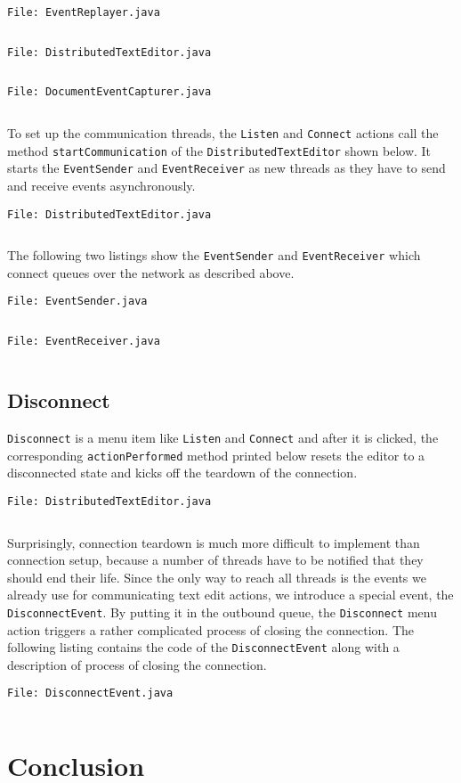 \documentclass[a4paper,draft,12pt,oneside,article,table]{memoir}
\newcommand{\srcpath}{../ex09/src/main/java/ddist}
\newcommand{\inmnt}[3]{\vspace{1em}\noindent\texttt{\color{gray}File: #3}\vspace{-1em}\inputminted[tabsize=4,firstline=#1,firstnumber=#1,lastline=#2,linenos]{java}{\srcpath/#3}}
\newcommand{\mil}[1]{\texttt{#1}}
\begin{document}
\inmnt{1}{1000}{EventReplayer.java}

\inmnt{43}{67}{DistributedTextEditor.java}

\inmnt{30}{39}{DocumentEventCapturer.java}

To set up the communication threads, the \mil{Listen} and \mil{Connect} actions
call the method \mil{startCommunication} of the
\mil{DistributedTextEditor} shown below. It starts the \mil{EventSender}
and \mil{EventReceiver} as new threads as they have to send and receive
events asynchronously.

\inmnt{300}{318}{DistributedTextEditor.java}

The following two listings show the \mil{EventSender} and
\mil{EventReceiver} which connect queues over the network as described
above.

\inmnt{1}{1000}{EventSender.java}

\inmnt{1}{1000}{EventReceiver.java}

\section{Disconnect}

\mil{Disconnect} is a menu item like \mil{Listen} and \mil{Connect} and
after it is clicked, the corresponding \mil{actionPerformed} method
printed below resets the editor to a disconnected state and kicks off
the teardown of the connection.

\inmnt{230}{240}{DistributedTextEditor.java}

Surprisingly, connection teardown is much more difficult to implement
than connection setup, because a number of threads have to be notified
that they should end their life. Since the only way to reach all threads
is the events we already use for communicating text edit actions, we
introduce a special event, the \mil{DisconnectEvent}. By putting it in
the outbound queue, the \mil{Disconnect} menu action triggers a rather
complicated process of closing the connection. The following listing
contains the code of the \mil{DisconnectEvent} along with a description
of process of closing the connection.

\inmnt{1}{1000}{DisconnectEvent.java}


\chapter{Conclusion}
\end{document}
